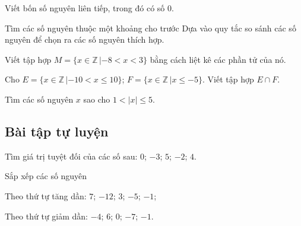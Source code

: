 \begin{vd}%
Viết bốn số nguyên liên tiếp, trong đó có số $0$.
\end{vd}

\begin{dang}{Tìm các số nguyên thuộc một khoảng cho trước}
Dựa vào quy tắc so sánh các số nguyên để chọn ra các số nguyên thích hợp.
\end{dang}

\begin{vd}%
Viết tập hợp $M=\{ x\in\mathbb{Z}\,| -8<x<3\}$ bằng cách liệt kê các phần tử của nó.
\end{vd}

\begin{vd}%
Cho $E=\{ x\in\mathbb{Z}\,| -10<x\le 10\}$; $F=\{ x\in\mathbb{Z}\,| x\le -5\}$. Viết tập hợp $E\cap F$.
\end{vd}

\begin{vd}%
Tìm các số nguyên $x$ sao cho $1<|x|\le 5$.
\end{vd}
\subsection{Bài tập tự luyện}
\begin{bt}%
Tìm giá trị tuyệt đối của các số sau: $0$; $-3$; $5$; $-2$; $4$.
\end{bt}

\begin{bt}%
Sắp xếp các số nguyên
\begin{enumEX}{1}
\item Theo thứ tự tăng dần: $7$; $-12$; $3$; $-5$; $-1$;
\item Theo thứ tự giảm dần: $-4$; $6$; $0$; $-7$; $-1$.
\end{enumEX}
\end{bt}

